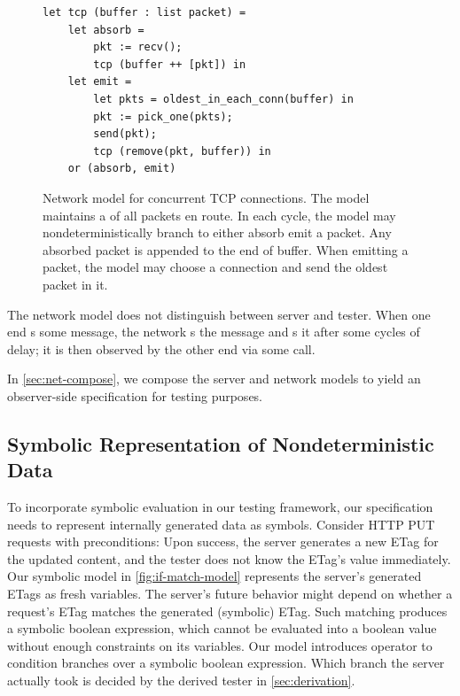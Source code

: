 \begin{figure}
\begin{lstlisting}[style=customcoq]
let tcp (buffer : list packet) =
    let absorb =
        pkt := recv();
        tcp (buffer ++ [pkt]) in
    let emit =
        let pkts = oldest_in_each_conn(buffer) in
        pkt := pick_one(pkts);
        send(pkt);
        tcp (remove(pkt, buffer)) in
    or (absorb, emit)
\end{lstlisting}
\caption{Network model for concurrent TCP connections.  The model maintains a
   of all packets en
  route.  In each cycle, the model may nondeterministically branch to either
  absorb  emit a packet.  Any absorbed packet is appended to the end of
  buffer.  When emitting a packet, the model may choose a connection and send
  the oldest packet in it.
}
\label{fig:tcp-model}
\end{figure}

The network model does not distinguish between server and tester.  When one end
s some message, the network s the message and s it
after some cycles of delay; it is then observed by the other end via some
 call.

In \autoref{sec:net-compose}, we compose the server and network models to yield an
observer-side specification for testing purposes.

\subsection{Symbolic Representation of Nondeterministic Data}
\label{sec:symbolic-model}

To incorporate symbolic evaluation in our testing framework, our specification
needs to represent internally generated data as symbols.  Consider HTTP
PUT requests with  preconditions: Upon success, the server
generates a new ETag for the updated content, and the tester does not know the
ETag's value immediately.  Our symbolic model in \autoref{fig:if-match-model}
represents the server's generated ETags as fresh variables.  The server's future
behavior might depend on whether a request's ETag matches the generated
(symbolic) ETag.  Such matching produces a symbolic boolean expression, which
cannot be evaluated into a boolean value without enough constraints on its
variables.  Our model introduces  operator to condition branches over
a symbolic boolean expression.  Which branch the server actually took is decided
by the derived tester in \autoref{sec:derivation}.

